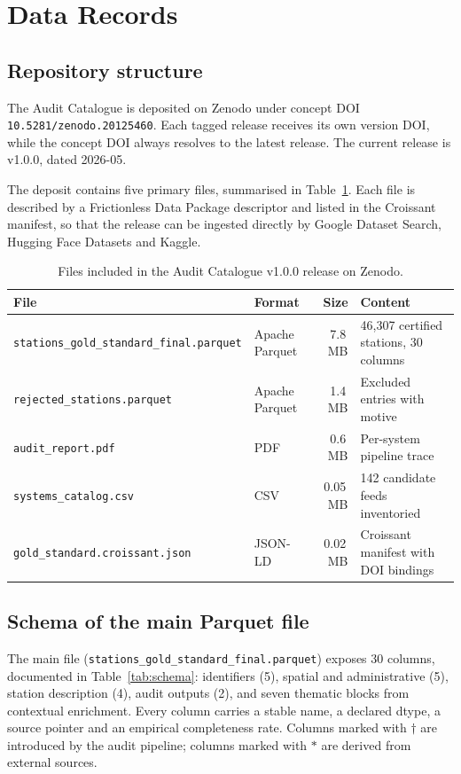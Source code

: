 \documentclass[11pt,a4paper]{article}
\begin{document}
\section{Data Records}\label{secRecords}

\subsection{Repository structure}
The Audit Catalogue is deposited on Zenodo under concept DOI
\texttt{10.5281/zenodo.20125460}. Each tagged release receives its
own version DOI, while the concept DOI always resolves to the latest
release. The current release is v1.0.0, dated 2026-05.

The deposit contains five primary files, summarised in
Table~\ref{tab:files}. Each file is described by a Frictionless Data
Package descriptor and listed in the Croissant manifest, so that the
release can be ingested directly by Google Dataset Search, Hugging
Face Datasets and Kaggle.

\begin{table}[ht]
\centering
\caption{Files included in the Audit Catalogue v1.0.0 release on Zenodo.}
\label{tab:files}
\small
\begin{tabular}{@{}llrl@{}}
\toprule
\textbf{File} & \textbf{Format} & \textbf{Size} & \textbf{Content}\\
\midrule
\texttt{stations\_gold\_standard\_final.parquet} & Apache Parquet & 7.8\,MB & 46{,}307 certified stations, 30 columns \\
\texttt{rejected\_stations.parquet}              & Apache Parquet & 1.4\,MB & Excluded entries with motive \\
\texttt{audit\_report.pdf}                       & PDF            & 0.6\,MB & Per-system pipeline trace \\
\texttt{systems\_catalog.csv}                    & CSV            & 0.05\,MB & 142 candidate feeds inventoried \\
\texttt{gold\_standard.croissant.json}           & JSON-LD        & 0.02\,MB & Croissant manifest with DOI bindings \\
\bottomrule
\end{tabular}
\end{table}

\subsection{Schema of the main Parquet file}
The main file (\texttt{stations\_gold\_standard\_final.parquet})
exposes 30 columns, documented in Table~\ref{tab:schema}: identifiers
(5), spatial and administrative (5), station description (4), audit
outputs (2), and seven thematic blocks from contextual enrichment.
Every column carries a stable name, a declared dtype, a source pointer
and an empirical completeness rate. Columns marked with $\dag$ are
introduced by the audit pipeline; columns marked with $\ast$ are
derived from external sources.
\end{document}
